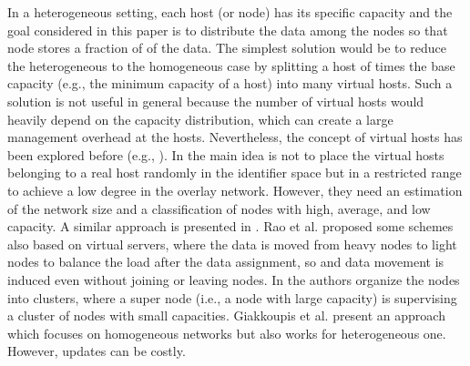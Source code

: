 \documentclass[11pt]{article}
\begin{document}
In a heterogeneous setting, each host (or node)  has its specific capacity
 and the goal considered in this paper is to distribute the data among
the nodes so that node  stores a fraction of  of the data. The simplest solution would be to reduce the
heterogeneous to the homogeneous case by splitting a host of  times the
base capacity (e.g., the minimum capacity of a host) into  many virtual
hosts. Such a solution is not useful in general because the number of virtual
hosts would heavily depend on the capacity distribution, which can create a
large management overhead at the hosts. Nevertheless, the concept of virtual
hosts has been explored before (e.g., \cite{godfrey,rao, skewccc+}). In
\cite{godfrey} the main idea is not to place the virtual hosts belonging to a
real host randomly in the identifier space but in a restricted range to
achieve a low degree in the overlay network. However, they need an estimation
of the network size and a classification of nodes with high, average, and low
capacity. A similar approach is presented in \cite{skewccc+}.
Rao et al. \cite{rao} proposed some schemes also based on virtual servers, where the data is moved from heavy nodes to light nodes to balance the load after the data assignment, so and data movement is induced even without joining or leaving nodes.
In \cite{supernode} the authors organize the nodes into clusters, where a
super node (i.e., a node with large capacity) is supervising a cluster of
nodes with small capacities. Giakkoupis et al. \cite{Giakkoupis} present an
approach which focuses on homogeneous networks but also works for
heterogeneous one. However, updates can be costly.
\end{document}

